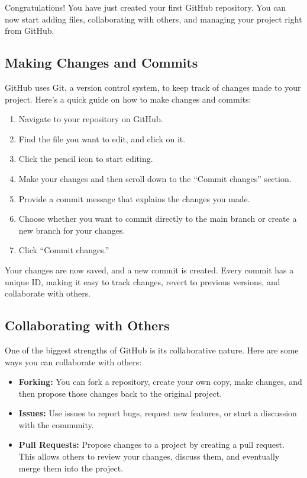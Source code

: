 \documentclass{book}
\begin{document}
Congratulations! You have just created your first GitHub repository. You can now start adding files, collaborating with others, and managing your project right from GitHub.

\subsection*{Making Changes and Commits}

GitHub uses Git, a version control system, to keep track of changes made to your project. Here’s a quick guide on how to make changes and commits:

\begin{enumerate}
    \item Navigate to your repository on GitHub.
    \item Find the file you want to edit, and click on it.
    \item Click the pencil icon to start editing.
    \item Make your changes and then scroll down to the “Commit changes” section.
    \item Provide a commit message that explains the changes you made.
    \item Choose whether you want to commit directly to the main branch or create a new branch for your changes.
    \item Click “Commit changes.”
\end{enumerate}

Your changes are now saved, and a new commit is created. Every commit has a unique ID, making it easy to track changes, revert to previous versions, and collaborate with others.

\subsection*{Collaborating with Others}

One of the biggest strengths of GitHub is its collaborative nature. Here are some ways you can collaborate with others:

\begin{itemize}
    \item \textbf{Forking:} You can fork a repository, create your own copy, make changes, and then propose those changes back to the original project.
    \item \textbf{Issues:} Use issues to report bugs, request new features, or start a discussion with the community.
    \item \textbf{Pull Requests:} Propose changes to a project by creating a pull request. This allows others to review your changes, discuss them, and eventually merge them into the project.
\end{itemize}
\end{document}
